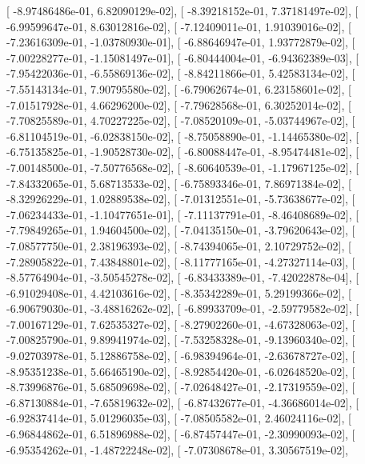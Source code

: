 \documentclass{article}
\begin{document}
       [ -8.97486486e-01,   6.82090129e-02],
       [ -8.39218152e-01,   7.37181497e-02],
       [ -6.99599647e-01,   8.63012816e-02],
       [ -7.12409011e-01,   1.91039016e-02],
       [ -7.23616309e-01,  -1.03780930e-01],
       [ -6.88646947e-01,   1.93772879e-02],
       [ -7.00228277e-01,  -1.15081497e-01],
       [ -6.80444004e-01,  -6.94362389e-03],
       [ -7.95422036e-01,  -6.55869136e-02],
       [ -8.84211866e-01,   5.42583134e-02],
       [ -7.55143134e-01,   7.90795580e-02],
       [ -6.79062674e-01,   6.23158601e-02],
       [ -7.01517928e-01,   4.66296200e-02],
       [ -7.79628568e-01,   6.30252014e-02],
       [ -7.70825589e-01,   4.70227225e-02],
       [ -7.08520109e-01,  -5.03744967e-02],
       [ -6.81104519e-01,  -6.02838150e-02],
       [ -8.75058890e-01,  -1.14465380e-02],
       [ -6.75135825e-01,  -1.90528730e-02],
       [ -6.80088447e-01,  -8.95474481e-02],
       [ -7.00148500e-01,  -7.50776568e-02],
       [ -8.60640539e-01,  -1.17967125e-02],
       [ -7.84332065e-01,   5.68713533e-02],
       [ -6.75893346e-01,   7.86971384e-02],
       [ -8.32926229e-01,   1.02889538e-02],
       [ -7.01312551e-01,  -5.73638677e-02],
       [ -7.06234433e-01,  -1.10477651e-01],
       [ -7.11137791e-01,  -8.46408689e-02],
       [ -7.79849265e-01,   1.94604500e-02],
       [ -7.04135150e-01,  -3.79620643e-02],
       [ -7.08577750e-01,   2.38196393e-02],
       [ -8.74394065e-01,   2.10729752e-02],
       [ -7.28905822e-01,   7.43848801e-02],
       [ -8.11777165e-01,  -4.27327114e-03],
       [ -8.57764904e-01,  -3.50545278e-02],
       [ -6.83433389e-01,  -7.42022878e-04],
       [ -6.91029408e-01,   4.42103616e-02],
       [ -8.35342289e-01,   5.29199366e-02],
       [ -6.90679030e-01,  -3.48816262e-02],
       [ -6.89933709e-01,  -2.59779582e-02],
       [ -7.00167129e-01,   7.62535327e-02],
       [ -8.27902260e-01,  -4.67328063e-02],
       [ -7.00825790e-01,   9.89941974e-02],
       [ -7.53258328e-01,  -9.13960340e-02],
       [ -9.02703978e-01,   5.12886758e-02],
       [ -6.98394964e-01,  -2.63678727e-02],
       [ -8.95351238e-01,   5.66465190e-02],
       [ -8.92854420e-01,  -6.02648520e-02],
       [ -8.73996876e-01,   5.68509698e-02],
       [ -7.02648427e-01,  -2.17319559e-02],
       [ -6.87130884e-01,  -7.65819632e-02],
       [ -6.87432677e-01,  -4.36686014e-02],
       [ -6.92837414e-01,   5.01296035e-03],
       [ -7.08505582e-01,   2.46024116e-02],
       [ -6.96844862e-01,   6.51896988e-02],
       [ -6.87457447e-01,  -2.30990093e-02],
       [ -6.95354262e-01,  -1.48722248e-02],
       [ -7.07308678e-01,   3.30567519e-02],
\end{document}
